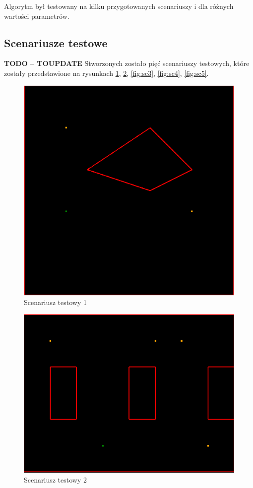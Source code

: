 \documentclass[11pt, leqno]{article}
\begin{document}
Algorytm był testowany na kilku przygotowanych scenariuszy i dla różnych wartości parametrów.

\subsection{Scenariusze testowe}
\textbf{TODO -- TOUPDATE}
Stworzonych zostało pięć scenariuszy testowych, które zostały przedstawione na rysunkach \ref{fig:sc1}, \ref{fig:sc2}, \ref{fig:sc3}, \ref{fig:sc4}, \ref{fig:sc5}.


\begin{figure}[h!]
	\centering
	\includegraphics[scale=0.4]{scenario1}
	\caption{Scenariusz testowy 1}
	\label{fig:sc1}
\end{figure}

\begin{figure}[h!]
	\centering
	\includegraphics[scale=0.4]{scenario2}
	\caption{Scenariusz testowy 2}
	\label{fig:sc2}
\end{figure}
\end{document}

